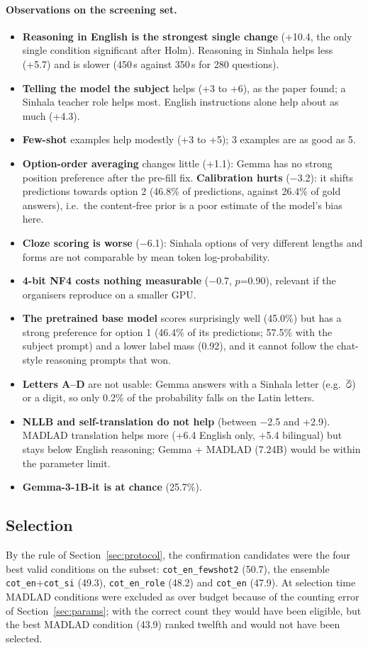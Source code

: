 \documentclass[10pt,a4paper]{article}
\newcommand{\si}[1]{{\sinhalafont #1}}
\newcommand{\cond}[1]{\texttt{#1}}
\begin{document}
\paragraph{Observations on the screening set.}
\begin{itemize}
\item \textbf{Reasoning in English is the strongest single change} (+10.4, the only single condition significant after
Holm). Reasoning in Sinhala helps less (+5.7) and is slower (450\,s against 350\,s for 280 questions).
\item \textbf{Telling the model the subject} helps (+3 to +6), as the paper found; a Sinhala teacher role helps most.
English instructions alone help about as much (+4.3).
\item \textbf{Few-shot} examples help modestly (+3 to +5); 3 examples are as good as 5.
\item \textbf{Option-order averaging} changes little (+1.1): Gemma has no strong position preference after the
pre-fill fix. \textbf{Calibration hurts} ($-$3.2): it shifts predictions towards option 2 (46.8\% of predictions,
against 26.4\% of gold answers), i.e.\ the content-free prior is a poor estimate of the model's bias here.
\item \textbf{Cloze scoring is worse} ($-$6.1): Sinhala options of very different lengths and forms are not
comparable by mean token log-probability.
\item \textbf{4-bit NF4 costs nothing measurable} ($-$0.7, $p$=0.90), relevant if the organisers reproduce on a
smaller GPU.
\item \textbf{The pretrained base model} scores surprisingly well (45.0\%) but has a strong preference for option 1
(46.4\% of its predictions; 57.5\% with the subject prompt) and a lower label mass (0.92), and it cannot follow the
chat-style reasoning prompts that won.
\item \textbf{Letters A--D} are not usable: Gemma answers with a Sinhala letter (e.g.\ \si{ඊ}) or a digit, so only 0.2\%
of the probability falls on the Latin letters.
\item \textbf{NLLB and self-translation do not help} (between $-$2.5 and +2.9). MADLAD translation helps more (+6.4
English only, +5.4 bilingual) but stays below English reasoning; Gemma + MADLAD (7.24B) would be within the
parameter limit.
\item \textbf{Gemma-3-1B-it is at chance} (25.7\%).
\end{itemize}

\subsection{Selection}\label{sec:select}
By the rule of Section~\ref{sec:protocol}, the confirmation candidates were the four best valid conditions on the
subset: \cond{cot\_en\_fewshot2} (50.7), the ensemble \cond{cot\_en}+\cond{cot\_si} (49.3), \cond{cot\_en\_role}
(48.2) and \cond{cot\_en} (47.9). At selection time MADLAD conditions were excluded as over budget because of the
counting error of Section~\ref{sec:params}; with the correct count they would have been eligible, but the best
MADLAD condition (43.9) ranked twelfth and would not have been selected.
\end{document}
